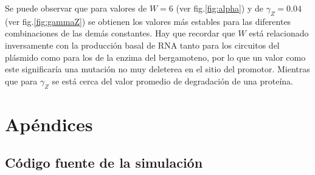 \documentclass[12pt]{article}
\begin{document}
Se puede observar que para valores de $W = 6 $ (ver fig.\ref{fig:alpha}) y de $\gamma _Z = 0.04$ (ver fig.\ref{fig:gammaZ}) se obtienen los valores m\'as estables para las diferentes combinaciones de las dem\'as constantes. Hay que recordar que $W$ est\'a relacionado inversamente con la producci\'on basal de RNA tanto para los circuitos del pl\'asmido como para los de la enzima del bergamoteno, por lo que un valor como este significar\'ia una mutaci\'on no muy deleterea en el sitio del promotor. Mientras que para $\gamma _Z$ se est\'a cerca del valor promedio de degradaci\'on de una prote\'ina.

\appendix
\section{Ap\'endices}
\subsection{C\'odigo fuente de la simulaci\'on}
\label{sec:code}



\end{document}
